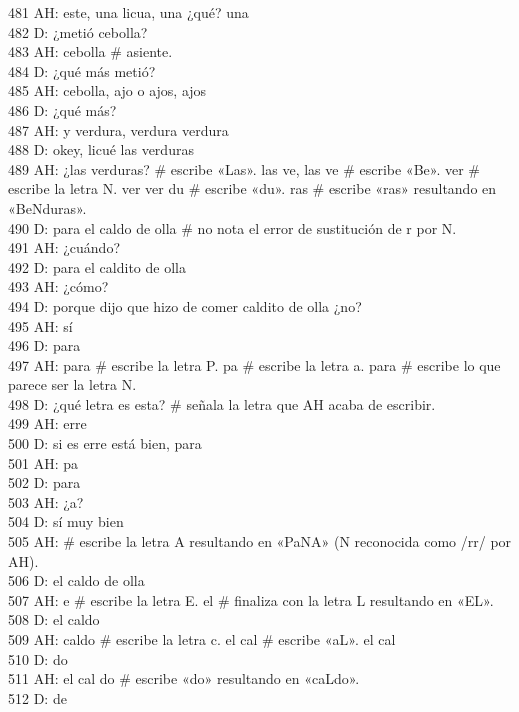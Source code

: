 481 AH: este, una licua, una ¿qué? una\\
482 D: ¿metió cebolla?\\
483 AH: cebolla \# asiente.\\
484 D: ¿qué más metió?\\
485 AH: cebolla, ajo o ajos, ajos\\
486 D: ¿qué más?\\
487 AH: y verdura, verdura verdura\\
488 D: okey, licué las verduras\\
489 AH: ¿las verduras? \# escribe «Las». las ve, las ve \# escribe «Be». ver \# escribe la letra N. ver ver du \# escribe «du». ras \# escribe «ras» resultando en «BeNduras».\\
490 D: para el caldo de olla \# no nota el error de sustitución de r por N.\\
491 AH: ¿cuándo?\\
492 D: para el caldito de olla\\
493 AH: ¿cómo?\\
494 D: porque dijo que hizo de comer caldito de olla ¿no?\\
495 AH: sí\\
496 D: para\\
497 AH: para \# escribe la letra P. pa \# escribe la letra a. para \# escribe lo que parece ser la letra N.\\
498 D: ¿qué letra es esta? \# señala la letra que AH acaba de escribir.\\
499 AH: erre\\
500 D: si es erre está bien, para\\
501 AH: pa\\
502 D: para\\
503 AH: ¿a?\\
504 D: sí muy bien\\
505 AH: \# escribe la letra A resultando en «PaNA» (N reconocida como /rr/ por AH).\\
506 D: el caldo de olla\\
507 AH: e \# escribe la letra E. el \# finaliza con la letra L resultando en «EL».\\
508 D: el caldo\\
509 AH: caldo \# escribe la letra c. el cal \# escribe «aL». el cal\\
510 D: do\\
511 AH: el cal do \# escribe «do» resultando en «caLdo».\\
512 D: de\\
